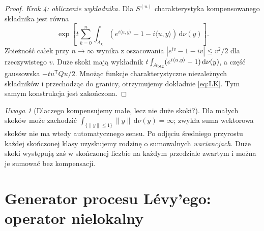 \documentclass[11pt,a4paper,oneside]{report}
\numberwithin{equation}{chapter}
\theoremstyle{plain}
\theoremstyle{definition}
\theoremstyle{remark}
\newtheorem{uwaga}{Uwaga}[chapter]
\newcommand{\dd}{\mathrm{d}}
\begin{document}
\begin{proof}
\emph{Krok 4: obliczenie wykładnika.} Dla $S^{(n)}$
charakterystyka kompensowanego składnika jest równa
\[
\exp\left[t\sum_{k=0}^n\int_{A_k}
(e^{i\langle u,y\rangle}-1-i\langle u,y\rangle)
\,\dd\nu(y)\right].
\]
Zbieżność całek przy $n\to\infty$ wynika z oszacowania
$|e^{iv}-1-iv|\le v^2/2$ dla rzeczywistego $v$.
Duże skoki mają wykładnik
$t\int_{A_{\rm big}}(e^{i\langle u,y\rangle}-1)\,\dd\nu(y)$,
a część gaussowska $-tu^{\mathsf T}Qu/2$.
Mnożąc funkcje charakterystyczne niezależnych składników
i przechodząc do granicy, otrzymujemy dokładnie
\eqref{eq:LK}. Tym samym konstrukcja jest zakończona.
\end{proof}

\begin{uwaga}[Dlaczego kompensujemy małe, lecz nie duże skoki?]
Dla małych skoków może zachodzić
$\int_{\{\|y\|\le1\}}\|y\|\,\dd\nu(y)=\infty$;
zwykła suma wektorowa skoków nie ma wtedy automatycznego
sensu. Po odjęciu średniego przyrostu każdej skończonej
klasy uzyskujemy rodzinę o sumowalnych \emph{wariancjach}.
Duże skoki występują zaś w skończonej liczbie na każdym
przedziale zwartym i można je sumować bez kompensacji.
\end{uwaga}

\section{Generator procesu Lévy'ego: operator nielokalny}
\end{document}
